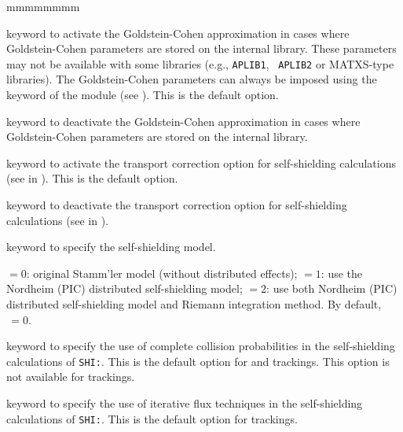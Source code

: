 \begin{ListeDeDescription}{mmmmmmmm}
\item[\moc{GC}] keyword to activate the Goldstein-Cohen approximation in
cases where Goldstein-Cohen parameters are stored on the internal library. These
parameters may not be available with some libraries (e.g., {\tt APLIB1}, {\tt
APLIB2} or MATXS-type libraries). The Goldstein-Cohen parameters can always be
imposed using the  keyword of the  module (see
). This is the default option.

\item[\moc{NOGC}] keyword to deactivate the Goldstein-Cohen approximation in
cases where Goldstein-Cohen parameters are stored on the internal library.

\item[\moc{TRAN}] keyword to activate the transport correction option for
self-shielding calculations (see  in ). This is the default option.

\item[\moc{NOTR}] keyword to deactivate the transport correction option for
self-shielding calculations (see  in ).

\item[\moc{LEVEL}] keyword to specify the self-shielding model.

\item[\dusa{ilev}] $=0$: original Stamm'ler model (without distributed effects);
 $=1$: use the Nordheim (PIC) distributed self-shielding model\cite{toronto04};
 $=2$: use both Nordheim (PIC) distributed self-shielding model and Riemann integration
 method\cite{hasan}. By default, $\,=0$.

\item[\moc{PIJ}] keyword to specify the use of complete collision
probabilities in the self-shielding calculations of {\tt SHI:}.
This is the default option for  and  trackings.
This option is not available for  trackings.

\item[\moc{ARM}] keyword to specify the use of iterative flux techniques
in the self-shielding calculations of {\tt SHI:}.
This is the default option for  trackings.

\end{ListeDeDescription}
\eject
